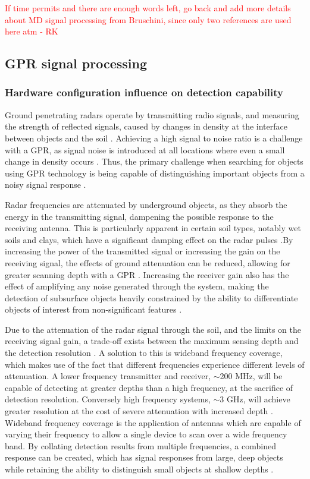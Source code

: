 \documentclass[main.tex]{subfiles}
\begin{document}
\textcolor{red}{If time permits and there are enough words left, go back and add more details about MD signal processing from Bruschini, since only two references are used here atm - RK}

\subsection{GPR signal processing}
\subsubsection{Hardware configuration influence on detection capability}
Ground penetrating radars operate by transmitting radio signals, and measuring the strength of reflected signals, caused by changes in density at the interface between objects and the soil \parencite{sakaguchi2014}. Achieving a high signal to noise ratio is a challenge with a GPR, as signal noise is introduced at all locations where even a small change in density occurs \parencite{shresta2003}. Thus, the primary challenge when searching for objects using GPR technology is being capable of distinguishing important objects from a noisy signal response \parencite{sakaguchi2014}.

Radar frequencies are attenuated by underground objects, as they absorb the energy in the transmitting signal, dampening the possible response to the receiving antenna. This is particularly apparent in certain soil types, notably wet soils and clays, which have a significant damping effect on the radar pulses \parencite{sakaguchi2014}.By increasing the power of the transmitted signal or increasing the gain on the receiving signal, the effects of ground attenuation can be reduced, allowing for greater scanning depth with a GPR \parencite{Ho2008}. Increasing the receiver gain also has the effect of amplifying any noise generated through the system, making the detection of subsurface objects heavily constrained by the ability to differentiate objects of interest from non-significant features \parencite{shresta2003}. 

Due to the attenuation of the radar signal through the soil, and the limits on the receiving signal gain, a trade-off exists between the maximum sensing depth and the detection resolution \parencite{Ho2008}. A solution to this is wideband frequency coverage, which makes use of the fact that different frequencies experience different levels of attenuation. A lower frequency transmitter and receiver, $\sim$200 MHz, will be capable of detecting at greater depths than a high frequency, at the sacrifice of detection resolution. Conversely high frequency systems, $\sim$3 GHz, will achieve greater resolution at the cost of severe attenuation with increased depth \parencite{shresta2003}. Wideband frequency coverage is the application of antennas which are capable of varying their frequency to allow a single device to scan over a wide frequency band. By collating detection results from multiple frequencies, a combined response can be created, which has signal responses from large, deep objects while retaining the ability to distinguish small objects at shallow depths \parencite{3dradarDXG}.
\end{document}
